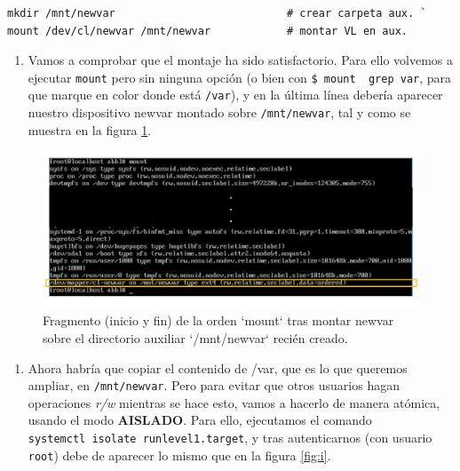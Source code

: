 \documentclass[
]{memoir}
\providecommand{\tightlist}{%
  \setlength{\itemsep}{0pt}\setlength{\parskip}{0pt}}
\begin{document}
\begin{verbatim}
mkdir /mnt/newvar                           # crear carpeta aux. ` 
mount /dev/cl/newvar /mnt/newvar            # montar VL en aux.
\end{verbatim}

\begin{enumerate}
\def\labelenumi{\arabic{enumi}.}
\setcounter{enumi}{8}
\tightlist
\item
  Vamos a comprobar que el montaje ha sido satisfactorio. Para ello volvemos a ejecutar \texttt{mount} pero sin ninguna opción (o bien con \texttt{\$\ mount\ \textbar{}\ grep\ var}, para que marque en color donde está \texttt{/var}), y en la última línea debería aparecer nuestro dispositivo newvar montado sobre \texttt{/mnt/newvar}, tal y como se muestra en la figura \ref{fig:h}.
\end{enumerate}

\begin{figure}

{\centering \includegraphics[width=0.8\linewidth]{images/h} 

}

\caption{Fragmento (inicio y fin) de la orden `mount` tras montar newvar sobre el directorio auxiliar `/mnt/newvar` recién creado.}\label{fig:h}
\end{figure}

\begin{enumerate}
\def\labelenumi{\arabic{enumi}.}
\setcounter{enumi}{9}
\tightlist
\item
  Ahora habría que copiar el contenido de /var, que es lo que queremos ampliar, en \texttt{/mnt/newvar}. Pero para evitar que otros usuarios hagan operaciones \emph{r/w} mientras se hace esto, vamos a hacerlo de manera atómica, usando el modo \textbf{AISLADO}. Para ello, ejecutamos el comando \texttt{systemctl\ isolate\ runlevel1.target}, y tras autenticarnos (con usuario \texttt{root}) debe de aparecer lo mismo que en la figura \ref{fig:i}.
\end{enumerate}
\end{document}
